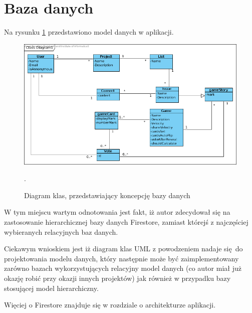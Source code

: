 \section{Baza danych}

Na rysunku \ref{rys:ClassDiagram} przedstawiono model danych w aplikacji.

\begin{figure}[H]
	\centering\includegraphics[width=\textwidth]{img/ClassDiagram}
	\caption{Diagram klas, przedstawiający koncepcję bazy danych}.
	\label{rys:ClassDiagram}
\end{figure}

W tym miejscu wartym odnotowania jest fakt, iż autor zdecydował się
na zastosowanie hierarchicznej bazy danych Firestore, zamiast którejś z najczęściej
wybieranych relacyjnych baz danych.

Ciekawym wnioskiem jest iż diagram klas UML z powodzeniem nadaje się do projektowania
modelu danych, który następnie może być zaimplementowany zarówno bazach
wykorzystujących relacyjny model danych (co autor miał już okazję robić
przy okazji innych projektów) jak również w przypadku bazy stosującej
model hierarchiczny.

Więciej o Firestore znajduje się w rozdziale o architekturze aplikacji.
